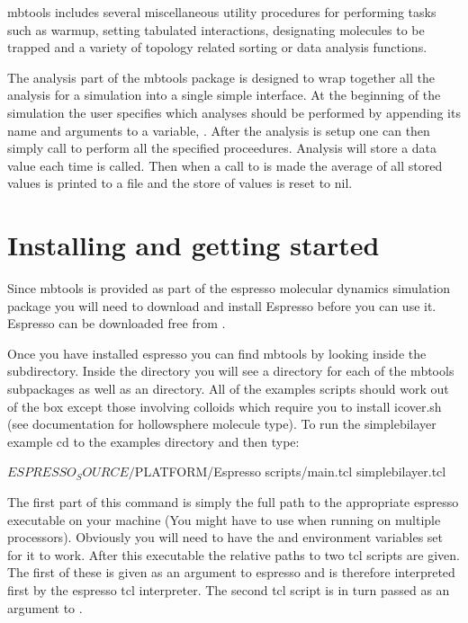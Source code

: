 mbtools includes several miscellaneous utility procedures for performing tasks such as warmup, setting tabulated interactions, designating molecules to be trapped and a variety of topology related sorting or data analysis functions.

The analysis part of the mbtools package is designed to wrap together all the analysis for a simulation into a single simple interface. At the beginning of the simulation the user specifies which analyses should be performed by appending its name and arguments to a variable, . After the analysis is setup one can then simply call  to perform all the specified proceedures. Analysis will store a data value each time  is called. Then when a call to  is made the average of all stored values is printed to a file and the store of values is reset to nil.

\section{Installing and getting started}

 Since mbtools is provided as part of the espresso molecular dynamics simulation package you will need to download and install Espresso before you can use it. Espresso can be downloaded free from  .

Once you have installed espresso you can find mbtools by looking inside the  subdirectory. Inside the  directory you will see a directory for each of the mbtools subpackages as well as an  directory. All of the examples scripts should work out of the box except those involving colloids which require you to install icover.sh (see documentation for hollowsphere molecule type). To run the simplebilayer example cd to the examples directory and then type: 

\begin{code}
  $ESPRESSO_SOURCE/$PLATFORM/Espresso scripts/main.tcl simplebilayer.tcl
\end{code}

The first part of this command is simply the full path to the appropriate espresso executable on your machine (You might have to use  when running on multiple processors). Obviously you will need to have the  and  environment variables set for it to work. After this executable the relative paths to two tcl scripts are given. The first of these  is given as an argument to espresso and is therefore interpreted first by the espresso tcl interpreter. The second tcl script  is in turn passed as an argument to .

